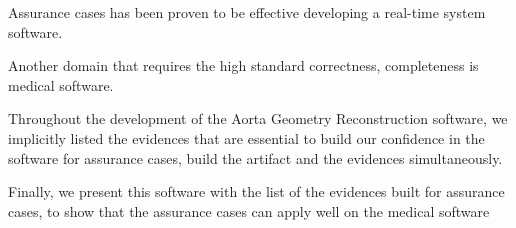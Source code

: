 
Assurance cases has been proven to be effective developing a real-time system software.

Another domain that requires the high standard correctness, completeness is medical software.

Throughout the development of the Aorta Geometry Reconstruction software, we implicitly listed the evidences that are essential to build our confidence in the software for assurance cases, build the artifact and the evidences simultaneously. 

Finally, we present this software with the list of the evidences built for assurance cases, to show that the assurance cases can apply well on the medical software